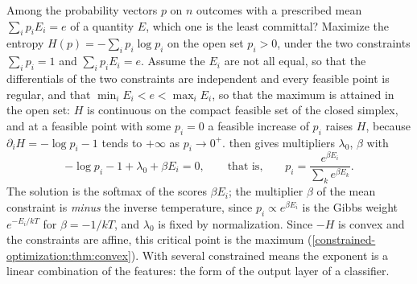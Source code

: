 \begin{notechapter}
\begin{mlthread}
Among the probability vectors $p$ on $n$ outcomes with a prescribed mean
$\sum_ip_iE_i = e$ of a quantity $E$, which one is the least committal?
Maximize the entropy $H(p) = -\sum_ip_i\log p_i$ on the open set
$p_i > 0$, under the two constraints $\sum_ip_i = 1$ and
$\sum_ip_iE_i = e$. Assume the $E_i$ are not all equal, so that the
differentials of the two constraints are independent and every feasible
point is regular, and that $\min_iE_i < e < \max_iE_i$, so that the
maximum is attained in the open set: $H$ is continuous on the compact
feasible set of the closed simplex, and at a feasible point with some
$p_i = 0$ a feasible increase of $p_i$ raises $H$, because
$\partial_iH = -\log p_i - 1$ tends to $+\infty$ as $p_i\to0^+$.
 then gives
multipliers $\lambda_0$, $\beta$ with
\[
  -\log p_i - 1 + \lambda_0 + \beta E_i = 0 ,
  \qquad\text{that is,}\qquad
  p_i = \frac{e^{\beta E_i}}{\sum_ke^{\beta E_k}} .
\]
The solution is the softmax of the scores $\beta E_i$; the multiplier
$\beta$ of the mean constraint is \emph{minus} the inverse temperature,
since $p_i\propto e^{\beta E_i}$ is the Gibbs weight $e^{-E_i/kT}$ for
$\beta = -1/kT$, and
$\lambda_0$ is fixed by normalization. Since $-H$ is convex and the
constraints are affine, this critical point is the maximum
(\cref{constrained-optimization:thm:convex}). With several constrained
means the exponent is a linear combination of the features: the form of
the output layer of a classifier.
\end{mlthread}


\end{notechapter}
